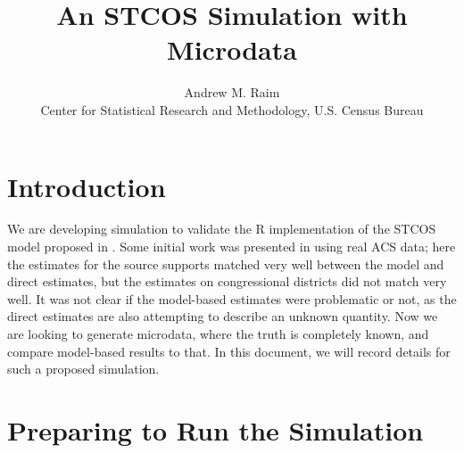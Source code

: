 \documentclass[12pt]{article}
\title{An STCOS Simulation with Microdata}
\author{Andrew M. Raim
\vspace{0.5em} \\
Center for Statistical Research and Methodology, U.S. Census Bureau
}
\begin{document}
\maketitle

\section{Introduction}
\label{sec:intro}
We are developing simulation to validate the R implementation of the STCOS model proposed in \citet{BradleyEtAl2016-STAT}. Some initial work was presented in \citet{JSM2017-STCOS} using real ACS data; here the estimates for the source supports matched very well between the model and direct estimates, but the estimates on congressional districts did not match very well. It was not clear if the model-based estimates were problematic or not, as the direct estimates are also attempting to describe an unknown quantity. Now we are looking to generate microdata, where the truth is completely known, and compare model-based results to that. In this document, we will record details for such a proposed simulation.

\section{Preparing to Run the Simulation}
\label{sec:sim-prep}
\end{document}
